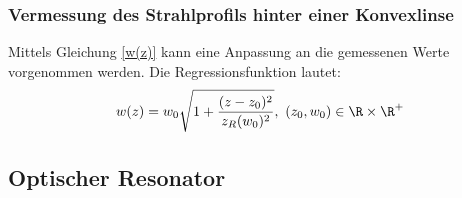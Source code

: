 \documentclass[11pt,a4paper,oneside]{scrartcl}
\begin{document}
\subsubsection{Vermessung des Strahlprofils hinter einer Konvexlinse}\label{Auswertung Vermessung des Strahlprofils hinter einer Konvexlinse}
Mittels Gleichung \ref{w(z)} kann eine Anpassung an die gemessenen Werte vorgenommen werden. Die Regressionsfunktion lautet:
\begin{equation}\label{w(z)}
w(z)=w_0\sqrt{1+\frac{(z-z_0)^2}{z_R(w_0)^2}},\ (z_0,w_0)\in \R\times\R^+
\end{equation}
\subsection{Optischer Resonator}
\end{document}
